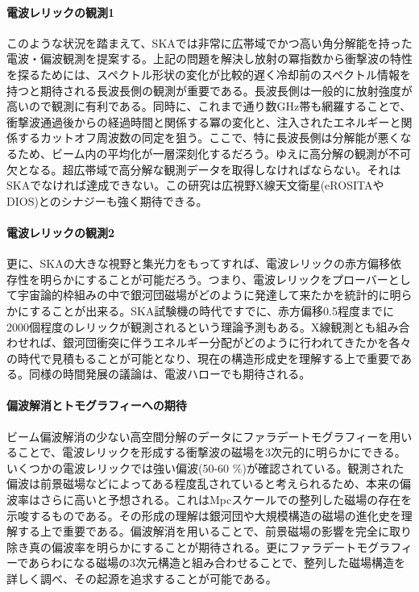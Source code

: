 \paragraph{電波レリックの観測1}

このような状況を踏まえて、SKAでは非常に広帯域でかつ高い角分解能を持った電波・偏波観測を提案する。上記の問題を解決し放射の冪指数から衝撃波の特性を探るためには、スペクトル形状の変化が比較的遅く冷却前のスペクトル情報を持つと期待される長波長側の観測が重要である。長波長側は一般的に放射強度が高いので観測に有利である。同時に、これまで通り数GHz帯も網羅することで、衝撃波通過後からの経過時間と関係する冪の変化と、注入されたエネルギーと関係するカットオフ周波数の同定を狙う。ここで、特に長波長側は分解能が悪くなるため、ビーム内の平均化が一層深刻化するだろう。ゆえに高分解の観測が不可欠となる。超広帯域で高分解な観測データを取得しなければならない。それはSKAでなければ達成できない。この研究は広視野X線天文衛星(eROSITAやDIOS)とのシナジーも強く期待できる。

\paragraph{電波レリックの観測2}

更に、SKAの大きな視野と集光力をもってすれば、電波レリックの赤方偏移依存性を明らかにすることが可能だろう。つまり、電波レリックをプローバーとして宇宙論的枠組みの中で銀河団磁場がどのように発達して来たかを統計的に明らかにすることが出来る。SKA試験機の時代ですでに、赤方偏移0.5程度までに2000個程度のレリックが観測されるという理論予測もある\citep{2012MNRAS.420.2006N}。X線観測とも組み合わせれば、銀河団衝突に伴うエネルギー分配がどのように行われてきたかを各々の時代で見積もることが可能となり、現在の構造形成史を理解する上で重要である。同様の時間発展の議論は、電波ハローでも期待される。

\paragraph{偏波解消とトモグラフィーへの期待}

ビーム偏波解消の少ない高空間分解のデータにファラデートモグラフィーを用いることで、電波レリックを形成する衝撃波の磁場を3次元的に明らかにできる。いくつかの電波レリックでは強い偏波(50-60 \%)が確認されている。観測された偏波は前景磁場などによってある程度乱されていると考えられるため、本来の偏波率はさらに高いと予想される。これはMpcスケールでの整列した磁場の存在を示唆するものである。その形成の理解は銀河団や大規模構造の磁場の進化史を理解する上で重要である。偏波解消を用いることで、前景磁場の影響を完全に取り除き真の偏波率を明らかにすることが期待される。更にファラデートモグラフィーであらわになる磁場の3次元構造と組み合わせることで、整列した磁場構造を詳しく調べ、その起源を追求することが可能である。


